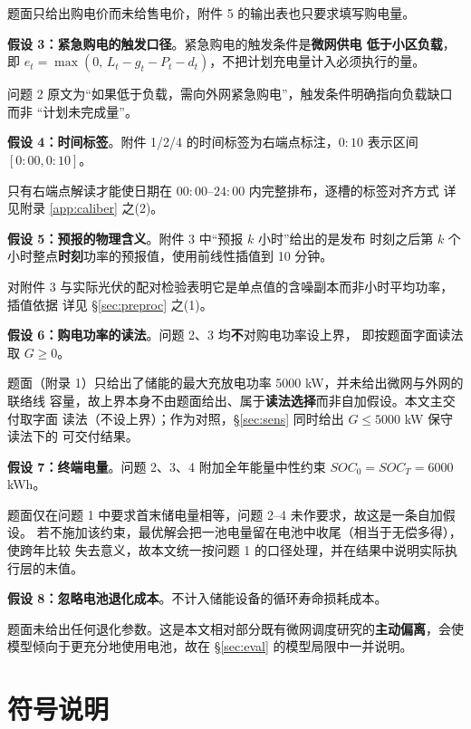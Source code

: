 \documentclass[withoutpreface]{cumcmthesis}
\renewcommand{\emph}[1]{\textbf{#1}}
\begin{document}
题面只给出购电价而未给售电价，附件 5 的输出表也只要求填写购电量。

\noindent \textbf{假设 3：紧急购电的触发口径}。紧急购电的触发条件是\emph{微网供电
低于小区负载}，即 $e_t=\max(0,\,L_t-g_t-P_t-d_t)$，不把计划充电量计入必须执行的量。

问题 2 原文为“如果低于负载，需向外网紧急购电”，触发条件明确指向负载缺口而非
“计划未完成量”。

\noindent \textbf{假设 4：时间标签}。附件 1/2/4 的时间标签为右端点标注，$0{:}10$
表示区间 $[0{:}00,0{:}10]$。

只有右端点解读才能使日期在 $00{:}00$--$24{:}00$ 内完整排布，逐槽的标签对齐方式
详见附录 \ref{app:caliber} 之(2)。

\noindent \textbf{假设 5：预报的物理含义}。附件 3 中“预报 $k$ 小时”给出的是发布
时刻之后第 $k$ 个小时整点\emph{时刻}功率的预报值，使用前线性插值到 10 分钟。

对附件 3 与实际光伏的配对检验表明它是单点值的含噪副本而非小时平均功率，插值依据
详见 \S\ref{sec:preproc} 之(1)。

\noindent \textbf{假设 6：购电功率的读法}。问题 2、3 均\emph{不}对购电功率设上界，
即按题面字面读法取 $G\ge0$。

题面（附录 1）只给出了储能的最大充放电功率 5000 kW，并未给出微网与外网的联络线
容量，故上界本身不由题面给出、属于\emph{读法选择}而非自加假设。本文主交付取字面
读法（不设上界）；作为对照，\S\ref{sec:sens} 同时给出 $G\le5000$ kW 保守读法下的
可交付结果。

\noindent \textbf{假设 7：终端电量}。问题 2、3、4 附加全年能量中性约束
$SOC_0=SOC_T=6000$ kWh。

题面仅在问题 1 中要求首末储电量相等，问题 2--4 未作要求，故这是一条自加假设。
若不施加该约束，最优解会把一池电量留在电池中收尾（相当于无偿多得），使跨年比较
失去意义，故本文统一按问题 1 的口径处理，并在结果中说明实际执行层的末值。

\noindent \textbf{假设 8：忽略电池退化成本}。不计入储能设备的循环寿命损耗成本。

题面未给出任何退化参数。这是本文相对部分既有微网调度研究的\emph{主动偏离}，会使
模型倾向于更充分地使用电池，故在 \S\ref{sec:eval} 的模型局限中一并说明。

\section{符号说明}
\end{document}
